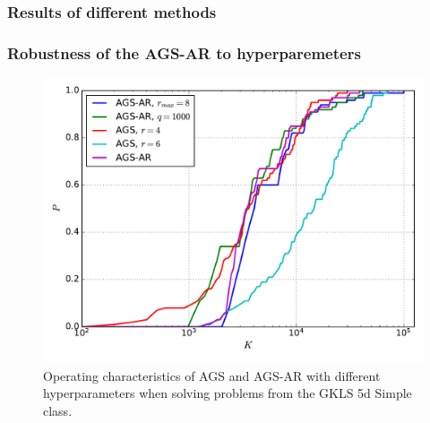 \documentclass[aspectratio=1610]{beamer}
\begin{document}
\begin{frame}
  \frametitle{Results of different methods}
  \begin{figure}[ht]
    \centering
  \end{figure}
\end{frame}

\begin{frame}
  \frametitle{Robustness of the AGS-AR to hyperparemeters}
  \begin{figure}[ht]
    \centering
    \includegraphics[width=.6\textwidth]{ar_stab.pdf}
    \caption{Operating characteristics of AGS and AGS-AR with different hyperparameters
    when solving problems from the GKLS 5d Simple class.}
    \label{fig:stability}
  \end{figure}
\end{frame}
\end{document}
